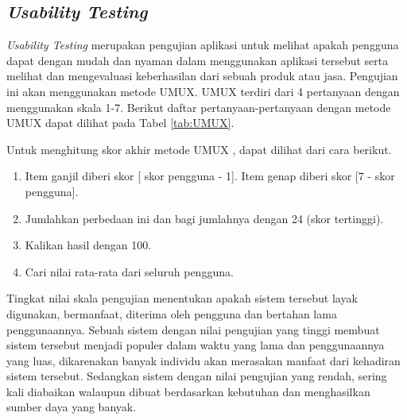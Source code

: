 \subsection{\textit{Usability Testing}}
\textit{Usability Testing} merupakan pengujian aplikasi untuk melihat apakah pengguna dapat dengan mudah dan nyaman dalam menggunakan aplikasi tersebut serta melihat dan mengevaluasi keberhasilan dari sebuah produk atau jasa. Pengujian ini akan menggunakan metode UMUX. UMUX terdiri dari 4 pertanyaan dengan menggunakan skala 1-7. Berikut daftar pertanyaan-pertanyaan dengan metode UMUX dapat dilihat pada Tabel \ref{tab:UMUX}.

\begin{table}[H]
\caption{Daftar Pertanyaan Metode UMUX.}
\label{tab:UMUX}
\end{table}

Untuk menghitung skor akhir metode UMUX \citep{brooke1996sus}, dapat dilihat dari cara berikut.

\begin{enumerate}
\item Item ganjil diberi skor [ skor pengguna - 1]. Item genap diberi skor [7 - skor pengguna].

\item Jumlahkan perbedaan ini dan bagi jumlahnya dengan 24 (skor tertinggi).

\item Kalikan hasil dengan 100.

\item Cari nilai rata-rata dari seluruh pengguna.
\end{enumerate}

\par Tingkat nilai skala pengujian menentukan apakah sistem tersebut layak digunakan, bermanfaat, diterima oleh pengguna dan bertahan lama penggunaannya. Sebuah sistem dengan nilai pengujian yang tinggi membuat sistem tersebut menjadi populer dalam waktu yang lama dan penggunaannya yang luas, dikarenakan banyak individu akan merasakan manfaat dari kehadiran sistem tersebut. Sedangkan sistem dengan nilai pengujian yang rendah, sering kali diabaikan walaupun dibuat berdasarkan kebutuhan dan menghasilkan sumber daya yang banyak.

